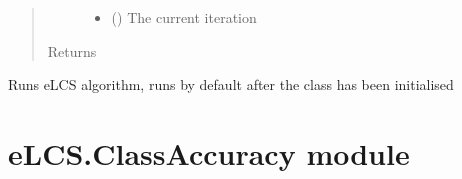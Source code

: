 \documentclass[letterpaper,10pt,english]{sphinxmanual}
\begin{document}
\begin{fulllineitems}
\begin{fulllineitems}
\begin{quote}
\begin{description}
\begin{itemize}
\item {} 
 () \textendash{} The current iteration

\end{itemize}

\item[{Returns}] \leavevmode


\end{description}\end{quote}

\end{fulllineitems}


\begin{fulllineitems}
\label{\detokenize{eLCS:eLCS.Algorithm.Algorithm.run_eLCS}}
Runs eLCS algorithm, runs by default after the class has been initialised

\end{fulllineitems}


\end{fulllineitems}



\section{eLCS.ClassAccuracy module}
\label{\detokenize{eLCS:module-eLCS.ClassAccuracy}}\label{\detokenize{eLCS:elcs-classaccuracy-module}}
\end{document}
